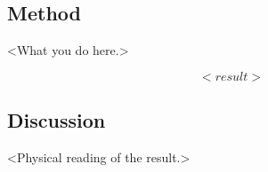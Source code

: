 
\subsection*{Method}
<What you do here.>

\begin{answerbox}
  \[
    <result>
  \]
\end{answerbox}

\subsection*{Discussion}
<Physical reading of the result.>
